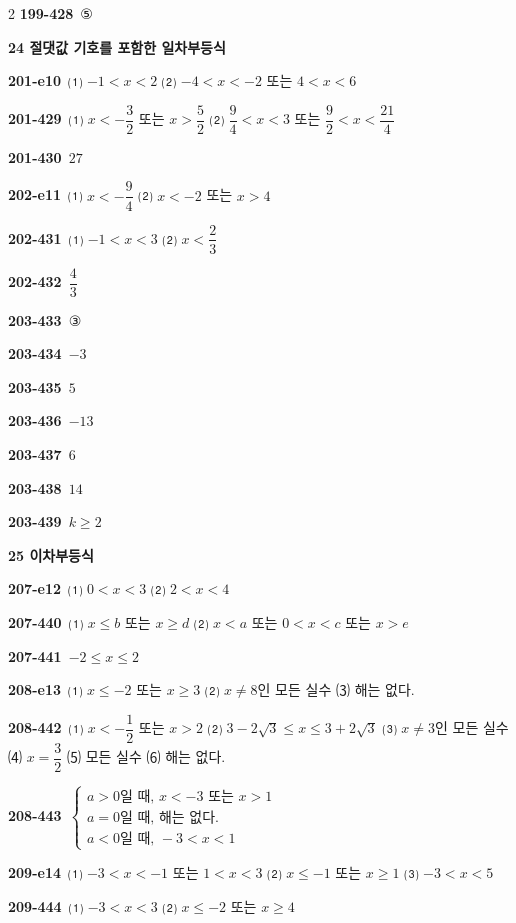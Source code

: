 \documentclass[10pt,a4paper]{article}
\begin{document}
\begin{multicols}{2}
\noindent\textbf{199-428}\ ⑤\par
\noindent\textbf{24 절댓값 기호를 포함한 일차부등식}\par\smallskip
\noindent\textbf{201-e10}\ ⑴ $-1<x<2$ ⑵ $-4<x<-2$ 또는 $4<x<6$\par
\noindent\textbf{201-429}\ ⑴ $x<-\dfrac{3}{2}$ 또는 $x>\dfrac{5}{2}$ \quad ⑵ $\dfrac{9}{4}<x<3$ 또는 $\dfrac{9}{2}<x<\dfrac{21}{4}$\par
\noindent\textbf{201-430}\ $27$\par
\noindent\textbf{202-e11}\ ⑴ $x<-\dfrac{9}{4}$ ⑵ $x<-2$ 또는 $x>4$\par
\noindent\textbf{202-431}\ ⑴ $-1<x<3$ ⑵ $x<\dfrac{2}{3}$\par
\noindent\textbf{202-432}\ $\dfrac{4}{3}$\par
\noindent\textbf{203-433}\ ③\par
\noindent\textbf{203-434}\ $-3$\par
\noindent\textbf{203-435}\ $5$\par
\noindent\textbf{203-436}\ $-13$\par
\noindent\textbf{203-437}\ $6$\par
\noindent\textbf{203-438}\ $14$\par
\noindent\textbf{203-439}\ $k\ge 2$\par
\noindent\textbf{25 이차부등식}\par\smallskip
\noindent\textbf{207-e12}\ ⑴ $0<x<3$ ⑵ $2<x<4$\par
\noindent\textbf{207-440}\ ⑴ $x\le b$ 또는 $x\ge d$ ⑵ $x<a$ 또는 $0<x<c$ 또는 $x>e$\par
\noindent\textbf{207-441}\ $-2\le x\le 2$\par
\noindent\textbf{208-e13}\ ⑴ $x\le -2$ 또는 $x\ge 3$ ⑵ $x\ne 8$인 모든 실수 ⑶ 해는 없다.\par
\noindent\textbf{208-442}\ ⑴ $x<-\dfrac{1}{2}$ 또는 $x>2$ ⑵ $3-2\sqrt{3}\le x\le 3+2\sqrt{3}$ ⑶ $x\ne 3$인 모든 실수 ⑷ $x=\dfrac{3}{2}$ ⑸ 모든 실수 ⑹ 해는 없다.\par
\noindent\textbf{208-443}\ $\begin{cases} a>0\text{일 때, } x<-3 \text{ 또는 } x>1 \\ a=0\text{일 때, 해는 없다.} \\ a<0\text{일 때, } -3<x<1 \end{cases}$\par
\noindent\textbf{209-e14}\ ⑴ $-3<x<-1$ 또는 $1<x<3$ ⑵ $x\le -1$ 또는 $x\ge 1$ ⑶ $-3<x<5$\par
\noindent\textbf{209-444}\ ⑴ $-3<x<3$ ⑵ $x\le -2$ 또는 $x\ge 4$\par

\end{multicols}
\end{document}
